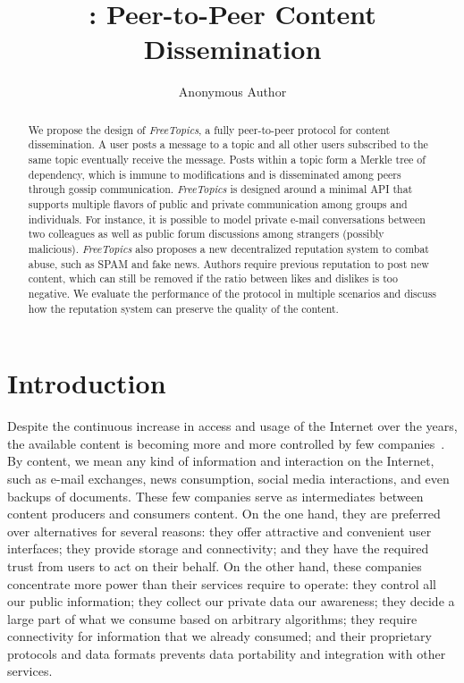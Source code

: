 \documentclass[12pt]{article}
\title{\FC: Peer-to-Peer Content Dissemination}
\author{Anonymous Author\inst{1}}
\newcommand{\FC}{\emph{FreeTopics}\xspace}
\begin{document}
 

\maketitle

\begin{abstract}
We propose the design of \FC, a fully peer-to-peer protocol for content
dissemination.
%
A user posts a message to a topic and all other users subscribed to the same
topic eventually receive the message.
Posts within a topic form a Merkle tree of dependency, which is immune to
modifications and is disseminated among peers through gossip communication.
%
\FC is designed around a minimal API that supports multiple flavors of public
and private communication among groups and individuals.
For instance, it is possible to model private e-mail conversations between two
colleagues as well as public forum discussions among strangers (possibly
malicious).
%
\FC also proposes a new decentralized reputation system to combat abuse, such
as SPAM and fake news.
Authors require previous reputation to post new content, which can still be
removed if the ratio between likes and dislikes is too negative.
%
We evaluate the performance of the protocol in multiple scenarios and discuss
how the reputation system can preserve the quality of the content.
\end{abstract}
     

\section{Introduction}

Despite the continuous increase in access and usage of the Internet over the
years, the available content is becoming more and more controlled by few
companies~\cite{internet.fixing}.
By content, we mean any kind of information and interaction on the Internet,
such as e-mail exchanges, news consumption, social media interactions, and even
backups of documents.
These few companies serve as intermediates between content producers and
consumers content.
On the one hand, they are preferred over alternatives for several reasons:
    they offer attractive and convenient user interfaces;
    they provide storage and connectivity; and
    they have the required trust from users to act on their behalf.
On the other hand, these companies concentrate more power than their services
require to operate:
    they control all our public information;
    they collect our private data our awareness;
    they decide a large part of what we consume based on arbitrary algorithms;
    they require connectivity for information that we already consumed; and
    their proprietary protocols and data formats prevents data portability and
    integration with other services.
\end{document}
